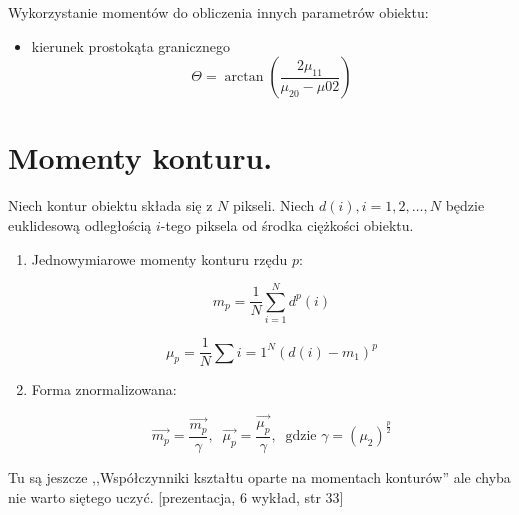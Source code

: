 \documentclass[a4paper,10pt]{article}
\begin{document}
Wykorzystanie momentów do obliczenia innych parametrów obiektu:
\begin{itemize}
 \item kierunek prostokąta granicznego
 \begin{equation}
   \Theta = \arctan \left(\frac{2 \mu_{11}}{\mu_{20} - \mu{02}}\right)
 \end{equation}
\end{itemize}

\section{Momenty konturu.}
Niech kontur obiektu składa się z $N$ pikseli. 
Niech $d(i), i=1,2,\ldots,N$ będzie euklidesową odległością $i$-tego piksela od środka ciężkości obiektu.

\begin{enumerate}
\item Jednowymiarowe momenty konturu rzędu $p$:

\begin{equation}
m_p = \frac{1}{N} \sum_{i=1}^{N} d^p(i)
\end{equation}

\begin{equation}
\mu_p = \frac{1}{N} \sum{i=1}^{N} (d(i) - m_1)^p
\end{equation}

\item Forma znormalizowana:

\begin{equation}
\overrightarrow{m_p} = \frac{\overrightarrow{m_p}}{\gamma},\;\; \overrightarrow{\mu_p} = \frac{\overrightarrow{\mu_p}}{\gamma}, \;\; \mbox{gdzie } \gamma = (\mu_2)^{\frac{p}{2}}
\end{equation}
\end{enumerate}

Tu są jeszcze ,,Współczynniki kształtu oparte na momentach konturów'' ale chyba nie warto siętego uczyć. [prezentacja, 6 wykład, str 33]
\end{document}
